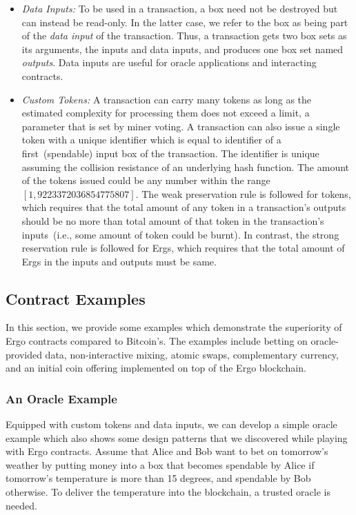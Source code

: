  \begin{itemize}
    \item {\em Data Inputs: }
 To be used in a transaction, a box need not be destroyed but can instead be read-only. In the latter case, we refer to the box as being part of the {\em data input} of the transaction. Thus, a transaction gets two box sets as its arguments, the inputs and
 data inputs, and produces one box set named {\em outputs}. Data inputs are useful for oracle applications and interacting contracts.

    \item {\em Custom Tokens: }
 A transaction can carry many tokens as long as the estimated complexity for processing them does not exceed a limit, a parameter that is set by miner voting. A transaction can also issue a single token with a unique identifier which is equal to identifier of a first~(spendable) input box of the transaction. The identifier is unique assuming the collision resistance of an underlying hash function.
 The amount of the tokens issued could be any number within the range $[1, 9223372036854775807]$. The weak preservation rule is followed for tokens, which requires that the total amount of any token in a transaction's outputs should be no more
 than total amount of that token in the transaction's inputs~(i.e., some amount of token could be burnt). In contrast, the strong reservation rule is followed for Ergs, which requires that the total amount of Ergs in the inputs and outputs must be same.
 \end{itemize}

\subsection{Contract Examples}
\label{sec:examples}

 In this section, we provide some examples which demonstrate the superiority of Ergo contracts compared to Bitcoin's. The examples include betting on oracle-provided data, non-interactive mixing, atomic swaps, complementary currency, and an initial coin offering implemented on top of the Ergo blockchain.

 \subsubsection{An Oracle Example}
 \label{sec:platform}

 Equipped with custom tokens and data inputs, we can develop a simple oracle example which also shows some design patterns that we discovered while playing with Ergo contracts. Assume that Alice and Bob want to bet on tomorrow's weather by putting money into a box that becomes spendable by Alice if tomorrow's temperature is more than 15 degrees, and spendable by Bob otherwise. To deliver the temperature into the blockchain, a trusted oracle is needed.

